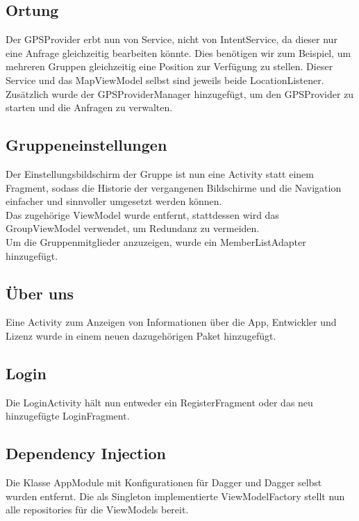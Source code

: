 \documentclass[parskip=full,11pt]{scrartcl}
\begin{document}
\subsection{Ortung}
Der GPSProvider erbt nun von Service, nicht von IntentService, da dieser
nur eine Anfrage gleichzeitig bearbeiten könnte. Dies benötigen wir
zum Beispiel, um mehreren Gruppen gleichzeitig eine Position zur
Verfügung zu stellen. Dieser Service und das MapViewModel selbst sind
jeweils beide LocationListener.\\
Zusätzlich wurde der GPSProviderManager hinzugefügt, um den
GPSProvider zu starten und die Anfragen zu verwalten.

\subsection{Gruppeneinstellungen}
Der Einstellungsbildschirm der Gruppe ist nun eine Activity statt einem
Fragment, sodass die Historie der vergangenen Bildschirme und die
Navigation einfacher und sinnvoller umgesetzt werden können.\\
Das zugehörige ViewModel wurde entfernt, stattdessen wird das
GroupViewModel verwendet, um Redundanz zu vermeiden.\\
Um die Gruppenmitglieder anzuzeigen, wurde ein MemberListAdapter
hinzugefügt.

\subsection{Über uns}
Eine Activity zum Anzeigen von Informationen über die App, Entwickler und
Lizenz wurde in einem neuen dazugehörigen Paket hinzugefügt.

\subsection{Login}
Die LoginActivity hält nun entweder ein RegisterFragment oder das neu
hinzugefügte LoginFragment.

\subsection{Dependency Injection}
Die Klasse AppModule mit Konfigurationen für Dagger und Dagger selbst
wurden entfernt. Die als Singleton implementierte ViewModelFactory stellt
nun alle repositories für die ViewModels bereit.
\end{document}
